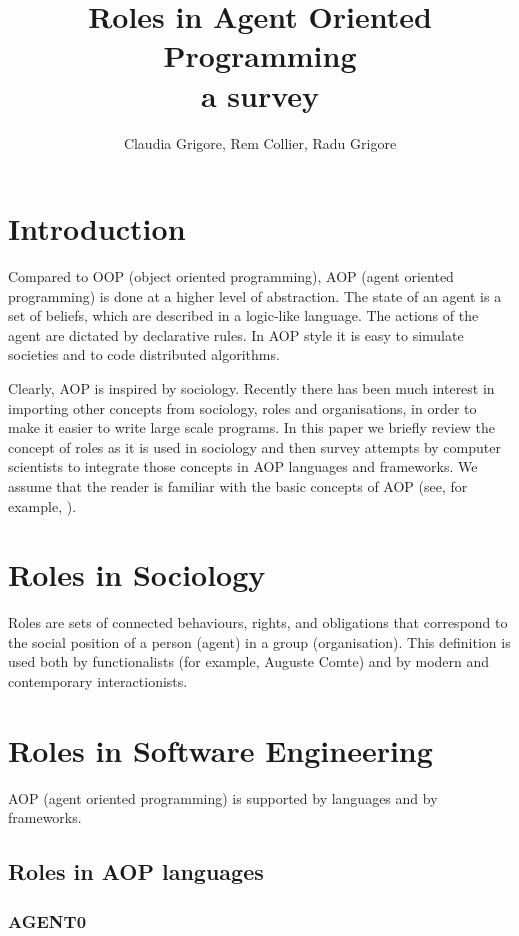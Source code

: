 \documentclass{article}
\title{Roles in Agent Oriented Programming\\\normalsize{a survey}}
\author{Claudia Grigore, Rem Collier, Radu Grigore}
\begin{document}
\maketitle

\section{Introduction}

Compared to OOP (object oriented programming), AOP (agent oriented
programming) is done at a higher level of abstraction. The state of
an agent is a set of beliefs, which are described in a logic-like
language. The actions of the agent are dictated by declarative rules.
In AOP style it is easy to simulate societies and to code distributed
algorithms.

Clearly, AOP is inspired by sociology. Recently there has been
much interest in importing other concepts from sociology, roles
and organisations, in order to make it easier to write large scale
programs. In this paper we briefly review the concept of roles as it
is used in sociology and then survey attempts by computer scientists
to integrate those concepts in AOP languages and frameworks. We assume
that the reader is familiar with the basic concepts of AOP (see, for
example, \cite{todo}).

\section{Roles in Sociology}

Roles are sets of connected behaviours, rights, and obligations
that correspond to the social position of a person (agent) in a
group (organisation). This definition is used both by functionalists
(for example, Auguste Comte) and by modern and contemporary
interactionists.


\section{Roles in Software Engineering}

AOP (agent oriented programming) is supported by languages and by
frameworks.

\subsection{Roles in AOP languages}

\subsubsection{AGENT0}
\end{document}
